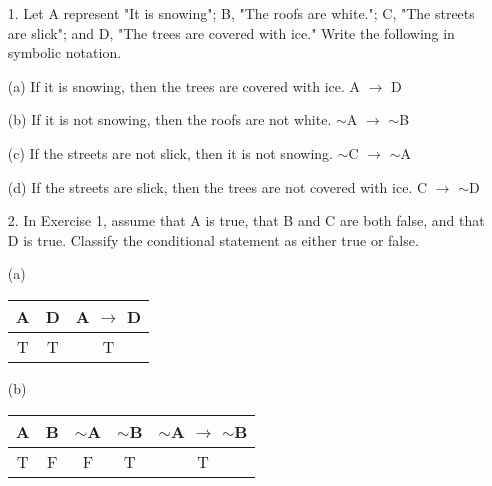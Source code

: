 \documentclass{article}
\begin{document}
\begin{itemize}
    (c) Use one of De Morgan's Laws to write the negation of this statement: Ardie can pay me now, or Ardie will work for me later.\\
    \emph{p}: Ardie can pay me now.\\
    \emph{q}: Ardie will work for me later.\\
    $\sim$(\emph{p} $\vee$ \emph{q}) is equivalent to $\sim$\emph{p} $\wedge$ $\sim$\emph{q} therefore to negate the statements, we can write: {\color{blue} Ardie can't pay me now and Ardie can't work for me later.}
    
    \item[1.] Let A represent "It is snowing"; B, "The roofs are white."; C, "The streets are slick"; and D, "The trees are covered with ice." Write the following in symbolic notation. 
    
    (a) If it is snowing, then the trees are covered with ice. {\color{blue} A $\to$ D}
    
    (b) If it is not snowing, then the roofs are not white. {\color{blue} $\sim$A $\to$ $\sim$B}
    
    (c) If the streets are not slick, then it is not snowing. {\color{blue} $\sim$C $\to$ $\sim$A}
    
    (d) If the streets are slick, then the trees are not covered with ice. {\color{blue} C $\to$ $\sim$D}
    
    \item[2.] In Exercise 1, assume that A is true, that B and C are both false, and that D is true.  Classify the conditional statement as either true or false.
    
    (a) \begin{center}
        \begin{tabular}{|c|c|c|}
            \hline
            A & D & A $\to$ D \\
            \hline
            T & T & T\\
            \hline
        \end{tabular}
    \end{center}
    
    (b) \begin{center}
        \begin{tabular}{|c|c|c|c|c|}
             \hline
             A & B & $\sim$A & $\sim$B & $\sim$A $\to$ $\sim$B\\
             \hline
             T & F & F & T & T \\
             \hline
        \end{tabular}
    \end{center}
    

\end{itemize}
\end{document}
